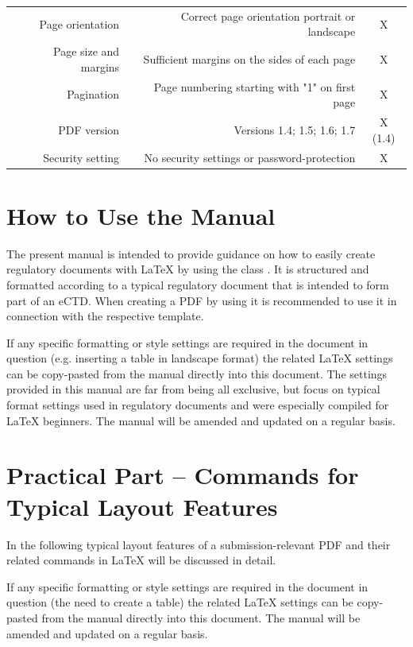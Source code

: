 \begin{table}[htbp]
\begin{tabular}{rrr}
Page orientation & Correct page orientation portrait or landscape & \multicolumn{1}{c}{X} \\
Page size and margins & Sufficient margins on the sides of each page & \multicolumn{1}{c}{X} \\
Pagination & Page numbering starting with "1" on first page & \multicolumn{1}{c}{X} \\
PDF version & Versions 1.4; 1.5; 1.6; 1.7  & \multicolumn{1}{c}{X (1.4)} \\
Security setting & No security settings or password-protection  & \multicolumn{1}{c}{X} \\
\bottomrule
\end{tabular}%
\label{tab:addlabel}%
\end{table}%

\section{How to Use the \PharmRep Manual}
The present manual is intended to provide guidance on how to easily create regulatory documents with \LaTeX{} by using the class \PharmRep.
It is structured and formatted according to a typical regulatory document that is intended to form part of an eCTD. When creating a PDF by using \PharmRep
it is recommended to use it in connection with the respective \PharmRep template.

If any specific formatting or style settings are required in the document in question (e.g. inserting a table in landscape format) the related \LaTeX{} settings
can be copy-pasted from the manual directly into this document. The settings provided in this manual are far from being all exclusive, but focus on typical format
settings used in regulatory documents and were especially compiled for \LaTeX{} beginners.
The manual will be amended and updated on a regular basis.

\section{Practical Part -- Commands for Typical Layout Features}
In the following typical layout features of a submission-relevant PDF and their related commands in \LaTeX{} will be
discussed in detail.

If any specific formatting or style settings are required in the document in question (\eg the need to
create a table) the related \LaTeX{} settings can be copy-pasted from the manual directly into this document.
The manual will be amended and updated on a regular basis.

